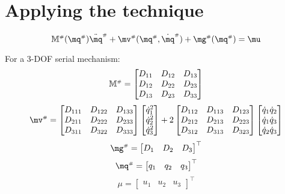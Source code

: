 \documentclass[a4paper,11pt,brazil,fleqn]{article}
\begin{document}

\section{Applying the technique}\label{S03}

\begin{equation}
\mM\ssh (\mq\ssh) \ddot{\mq}\ssh + \mv\ssh(\mq\ssh,\dot{\mq}\ssh) + \mg\ssh (\mq\ssh) = \mu
\end{equation}

For a 3-DOF serial mechanism:
\begin{equation}
\mathbb{M}^{\scriptscriptstyle \#} = 
\begin{bmatrix}
D_{11} & D_{12} & D_{13} \\
D_{12} & D_{22} & D_{23} \\
D_{13} & D_{23} & D_{33} \\
\end{bmatrix}
\end{equation}
\begin{equation}
\mv\ssh = 
\begin{bmatrix}
D_{111} & D_{122} & D_{133} \\
D_{211} & D_{222} & D_{233} \\
D_{311} & D_{322} & D_{333} \\
\end{bmatrix}
\begin{bmatrix}
\dot{q}_1^2 \\
\dot{q}_2^2 \\
\dot{q}_3^2 \\
\end{bmatrix}
+
2\begin{bmatrix}
D_{112} & D_{113} & D_{123} \\
D_{212} & D_{213} & D_{223} \\
D_{312} & D_{313} & D_{323} \\
\end{bmatrix}
\begin{bmatrix}
\dot{q}_1 \dot{q}_2 \\
\dot{q}_1 \dot{q}_3 \\
\dot{q}_2 \dot{q}_3 \\
\end{bmatrix}
\end{equation}
\begin{equation}
\mg\ssh =
\begin{bmatrix}
D_1 &
D_2 &
D_3
\end{bmatrix}^\top
\end{equation}
\begin{equation}
\mq\ssh =
\begin{bmatrix}
q_1 &
q_2 &
q_3
\end{bmatrix}^\top
\end{equation}
\begin{equation}
\mu =
\begin{bmatrix}
u_1 &
u_2 &
u_3
\end{bmatrix}^\top
\end{equation}
\end{document}
